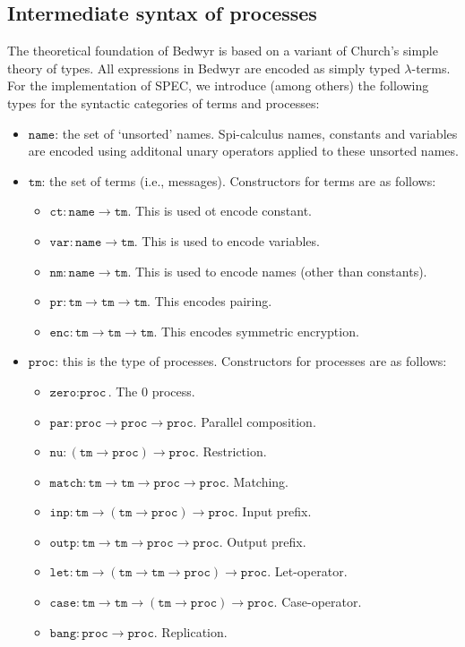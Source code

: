 \documentclass{article}
\newcommand\obj[1]{\texttt{#1}}
\begin{document}
\subsection{Intermediate syntax of processes}



The theoretical foundation of Bedwyr is based on a variant of Church's simple theory of
types. All expressions in Bedwyr are encoded as simply typed $\lambda$-terms. 
For the implementation of SPEC, we introduce (among others) the following types for
the syntactic categories of terms and processes:
\begin{itemize}
\item $\obj{name}$: the set of `unsorted' names. Spi-calculus names, constants and variables
are encoded using additonal unary operators applied to these unsorted names.

\item $\obj{tm}$: the set of terms (i.e., messages). Constructors for terms are as follows:
\begin{itemize}
\item $\obj{ct} : \obj{name} \to \obj{tm}$. This is used ot encode constant. 
\item $\obj{var} : \obj{name} \to \obj{tm}$. This is used to encode variables. 
\item $\obj{nm} : \obj{name} \to \obj{tm}$. This is used to encode names (other than constants). 
\item $\obj{pr} : \obj{tm} \to \obj{tm} \to \obj{tm}$. This encodes pairing.
\item $\obj{enc} : \obj{tm} \to \obj{tm} \to \obj{tm}$. This encodes symmetric encryption.
\end{itemize}

\item $\obj{proc}$: this is the type of processes. Constructors for processes are as follows:
\begin{itemize}
\item $\obj{zero} : \obj{proc}$. The $0$ process.
\item $\obj{par} : \obj{proc} \to \obj{proc} \to \obj{proc}$. Parallel composition.
\item $\obj{nu} : (\obj{tm} \to \obj{proc}) \to \obj{proc}$. Restriction. 
\item $\obj{match} : \obj{tm} \to \obj{tm} \to \obj{proc} \to \obj{proc}$. Matching.
\item $\obj{inp} : \obj{tm} \to (\obj{tm} \to \obj{proc}) \to \obj{proc}$. Input prefix.
\item $\obj{outp} : \obj{tm} \to \obj{tm} \to \obj{proc} \to \obj{proc}$. Output prefix.
\item $\obj{let} : \obj{tm} \to (\obj{tm} \to \obj{tm} \to \obj{proc}) \to \obj{proc}.$ Let-operator.
\item $\obj{case} : \obj{tm} \to \obj{tm} \to (\obj{tm} \to \obj{proc}) \to \obj{proc}.$ Case-operator.
\item $\obj{bang} : \obj{proc} \to \obj{proc}$. Replication.
\end{itemize}

\end{itemize}
\end{document}
